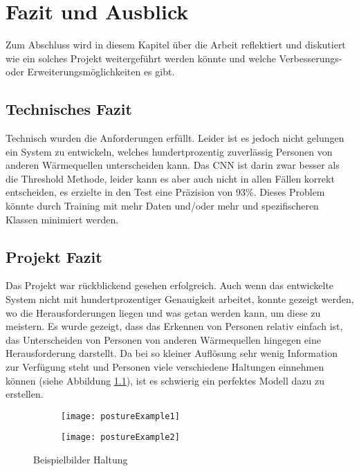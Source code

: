 \chapter{Fazit und Ausblick}
\label{ch:Ausblick}

Zum Abschluss wird in diesem Kapitel über die Arbeit reflektiert und diskutiert wie ein solches Projekt weitergeführt werden könnte und welche Verbesserungs- oder Erweiterungsmöglichkeiten es gibt.

\section{Technisches Fazit}

Technisch wurden die Anforderungen erfüllt. Leider ist es jedoch nicht gelungen ein System zu entwickeln, welches hundertprozentig zuverlässig Personen von anderen Wärmequellen unterscheiden kann. Das \gls{CNN} ist darin zwar besser als die Threshold Methode, leider kann es aber auch nicht in allen Fällen korrekt entscheiden, es erzielte in den Test eine Präzision von 93\%. Dieses Problem könnte durch Training mit mehr Daten und/oder mehr und spezifischeren Klassen minimiert werden.

\section{Projekt Fazit}

Das Projekt war rückblickend gesehen erfolgreich. Auch wenn das entwickelte System nicht mit hundertprozentiger Genauigkeit arbeitet, konnte gezeigt werden, wo die Herausforderungen liegen und was getan werden kann, um diese zu meistern. Es wurde gezeigt, dass das Erkennen von Personen relativ einfach ist, das Unterscheiden von Personen von anderen Wärmequellen hingegen eine Herausforderung darstellt. Da bei so kleiner Auflösung sehr wenig Information zur Verfügung steht und Personen viele verschiedene Haltungen einnehmen können (siehe Abbildung \ref{fig:postureExample}), ist es schwierig ein perfektes Modell dazu zu erstellen.

\begin{figure}[H]
	\centering
	\begin{subfigure}{.4\linewidth}
		\centering
		\texttt{[image: postureExample1]}
	\end{subfigure}
	\begin{subfigure}{.4\linewidth}
		\centering
		\texttt{[image: postureExample2]}
	\end{subfigure}	
	\caption{Beispielbilder Haltung}
	\label{fig:postureExample}
\end{figure}

